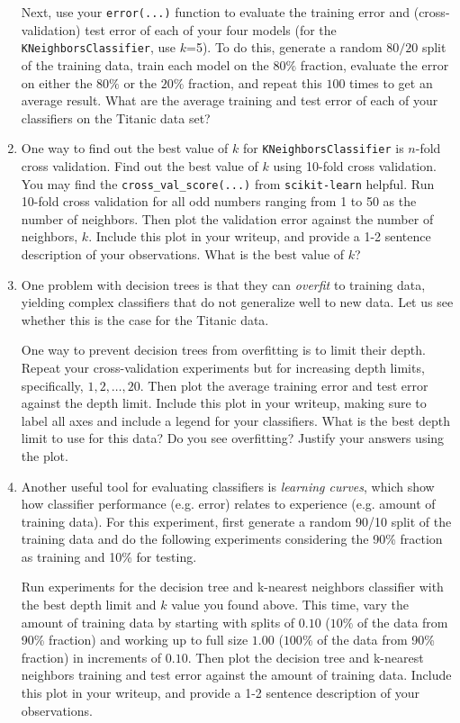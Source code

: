 \begin{enumerate}[resume]
Next, use your \verb|error(...)| function to evaluate the training error and (cross-validation) test error of each of your four models (for the \verb|KNeighborsClassifier|, use $k$=5). To do this, generate a random $80/20$ split of the training data, train each model on the $80\%$ fraction, evaluate the error on either the $80\%$ or the $20\%$ fraction, and repeat this $100$ times to get an average result. What are the average training and test error of each of your classifiers on the Titanic data set?


\item {} One way to find out the best value of $k$ for \verb|KNeighborsClassifier| is $n$-fold cross validation.
Find out the best value of $k$ using 10-fold cross validation. You may find the \verb|cross_val_score(...)| from \verb|scikit-learn| helpful. Run 10-fold cross validation for all odd numbers ranging from 1 to 50 as the number of neighbors.
Then plot the validation error against the number of neighbors, $k$.
Include this plot in your writeup, and provide a 1-2 sentence description of your observations. What is the best value of $k$?


\item {} One problem with decision trees is that they can \emph{overfit} to training data, yielding complex classifiers that do not generalize well to new data. Let us see whether this is the case for the Titanic data.

One way to prevent decision trees from overfitting is to limit their depth. Repeat your cross-validation experiments but for increasing depth limits, specifically, $1,2,\ldots,20$. Then plot the average training error and test error against the depth limit. 
Include this plot in your writeup, making sure to label all axes and include a legend for your classifiers. What is the best depth limit to use for this data? Do you see overfitting? Justify your answers using the plot.

\item {} Another useful tool for evaluating classifiers is \emph{learning curves}, which show how classifier performance (e.g. error) relates to experience (e.g. amount of training data).
For this experiment, first generate a random 90/10 split of the training data and do the following experiments considering the 90\% fraction as training and 10\% for testing. 

Run experiments for the decision tree and k-nearest neighbors classifier with the best depth limit and $k$ value you found above.
This time, vary the amount of training data by starting with splits of $0.10$ ($10\%$ of the data from 90\% fraction) and working up to full size $1.00$ ($100\%$ of the data from 90\% fraction) in increments of $0.10$. Then plot the decision tree and k-nearest neighbors training and test error against the amount of training data. 
Include this plot in your writeup, and provide a 1-2 sentence description of your observations.

\end{enumerate}